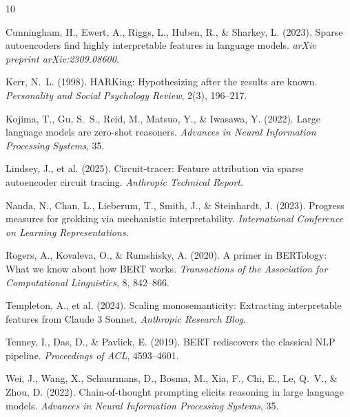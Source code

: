 \documentclass{article}
\begin{document}

\begin{thebibliography}{10}

Cunningham, H., Ewert, A., Riggs, L., Huben, R., \& Sharkey, L. (2023).
\newblock Sparse autoencoders find highly interpretable features in language models.
\newblock \textit{arXiv preprint arXiv:2309.08600}.

Kerr, N.~L. (1998).
\newblock HARKing: Hypothesizing after the results are known.
\newblock \textit{Personality and Social Psychology Review}, 2(3), 196--217.

Kojima, T., Gu, S.~S., Reid, M., Matsuo, Y., \& Iwasawa, Y. (2022).
\newblock Large language models are zero-shot reasoners.
\newblock \textit{Advances in Neural Information Processing Systems}, 35.

Lindsey, J., et al. (2025).
\newblock Circuit-tracer: Feature attribution via sparse autoencoder circuit tracing.
\newblock \textit{Anthropic Technical Report}.

Nanda, N., Chan, L., Lieberum, T., Smith, J., \& Steinhardt, J. (2023).
\newblock Progress measures for grokking via mechanistic interpretability.
\newblock \textit{International Conference on Learning Representations}.

Rogers, A., Kovaleva, O., \& Rumshisky, A. (2020).
\newblock A primer in BERTology: What we know about how BERT works.
\newblock \textit{Transactions of the Association for Computational Linguistics}, 8, 842--866.

Templeton, A., et al. (2024).
\newblock Scaling monosemanticity: Extracting interpretable features from Claude 3 Sonnet.
\newblock \textit{Anthropic Research Blog}.

Tenney, I., Das, D., \& Pavlick, E. (2019).
\newblock BERT rediscovers the classical NLP pipeline.
\newblock \textit{Proceedings of ACL}, 4593--4601.

Wei, J., Wang, X., Schuurmans, D., Bosma, M., Xia, F., Chi, E., Le, Q.~V., \& Zhou, D. (2022).
\newblock Chain-of-thought prompting elicits reasoning in large language models.
\newblock \textit{Advances in Neural Information Processing Systems}, 35.

\end{thebibliography}
\end{document}

